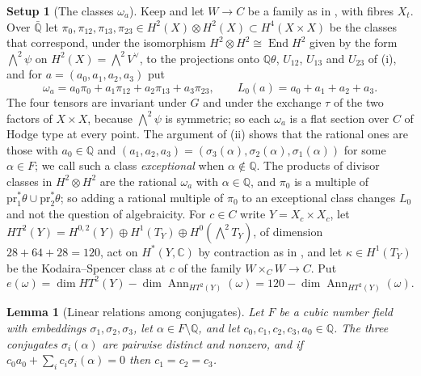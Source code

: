 \documentclass[11pt,reqno]{amsart}
\theoremstyle{plain}
\newtheorem{lemma}[theorem]{Lemma}
\theoremstyle{definition}
\newtheorem{setupenv}[theorem]{Setup}
\theoremstyle{remark}
\newcommand{\QQ}{\mathbb{Q}}
\newcommand{\CC}{\mathbb{C}}
\DeclareMathOperator{\End}{End}
\DeclareMathOperator{\Ann}{Ann}
\begin{document}
\begin{setupenv}[The classes $\omega_{a}$]\label{setup:omegaa}
Keep  and let $W\to C$ be a family as in
, with fibres $X_{t}$. Over $\bar{\QQ}$ let
$\pi_{0},\pi_{12},\pi_{13},\pi_{23}\in H^{2}(X)\otimes H^{2}(X)\subset
H^{4}(X\times X)$ be the classes that correspond, under the isomorphism
$H^{2}\otimes H^{2}\cong\End H^{2}$ given by the form ${\textstyle\bigwedge^{2}}\psi$
on $H^{2}(X)={\textstyle\bigwedge^{2}}V^{\vee}$, to the projections onto $\QQ\theta$,
$U_{12}$, $U_{13}$ and $U_{23}$ of (i), and for
$a=(a_{0},a_{1},a_{2},a_{3})$ put
\[
  \omega_{a}=a_{0}\pi_{0}+a_{1}\pi_{12}+a_{2}\pi_{13}+a_{3}\pi_{23},
  \qquad L_{0}(a)=a_{0}+a_{1}+a_{2}+a_{3}.
\]
The four tensors are invariant under $G$ and under the exchange $\tau$ of the
two factors of $X\times X$, because ${\textstyle\bigwedge^{2}}\psi$ is symmetric; so each
$\omega_{a}$ is a flat section over $C$ of Hodge type at every point. The
argument of (ii) shows that the rational ones are those
with $a_{0}\in\QQ$ and $(a_{1},a_{2},a_{3})=(\sigma_{3}(\alpha),
\sigma_{2}(\alpha),\sigma_{1}(\alpha))$ for some $\alpha\in F$; we call such a
class \emph{exceptional} when $\alpha\notin\QQ$. The products of divisor
classes in $H^{2}\otimes H^{2}$ are the rational $\omega_{a}$ with
$\alpha\in\QQ$, and $\pi_{0}$ is a multiple of
$\mathrm{pr}_{1}^{*}\theta\cup\mathrm{pr}_{2}^{*}\theta$; so adding a rational
multiple of $\pi_{0}$ to an exceptional class changes $L_{0}$ and not the
question of algebraicity. For $c\in C$ write $Y=X_{c}\times X_{c}$, let
$HT^{2}(Y)=H^{0,2}(Y)\oplus H^{1}(T_{Y})\oplus H^{0}({\textstyle\bigwedge^{2}}T_{Y})$,
of dimension $28+64+28=120$, act on $H^{*}(Y,\CC)$ by contraction as in
\cite[Setup~4.54]{paperII}, and let $\kappa\in H^{1}(T_{Y})$ be the Kodaira--Spencer class
at $c$ of the family $W\times_{C}W\to C$. Put
\[
  e(\omega)=\dim HT^{2}(Y)-\dim\Ann_{HT^{2}(Y)}(\omega)
  =120-\dim\Ann_{HT^{2}(Y)}(\omega).
\]
\end{setupenv}

\begin{lemma}[Linear relations among conjugates]\label{lem:conjugates}
Let $F$ be a cubic number field with embeddings $\sigma_{1},\sigma_{2},
\sigma_{3}$, let $\alpha\in F\setminus\QQ$, and let
$c_{0},c_{1},c_{2},c_{3},a_{0}\in\QQ$. The three conjugates
$\sigma_{i}(\alpha)$ are pairwise distinct and nonzero, and if
$c_{0}a_{0}+\sum_{i}c_{i}\sigma_{i}(\alpha)=0$ then $c_{1}=c_{2}=c_{3}$.
\end{lemma}
\end{document}
